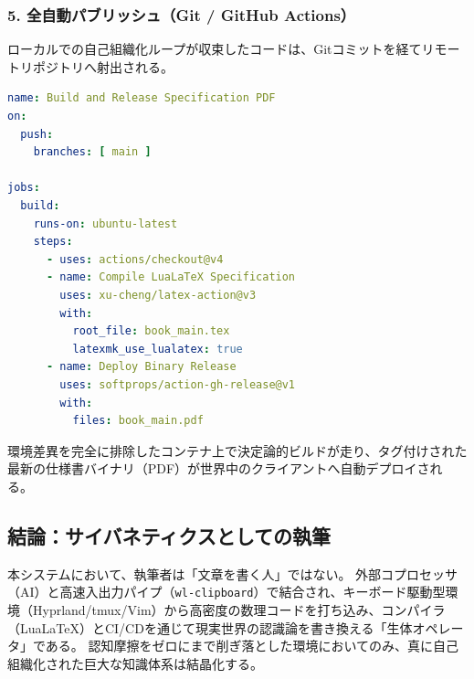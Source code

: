 \subsubsection{5. 全自動パブリッシュ（Git / GitHub Actions）}
ローカルでの自己組織化ループが収束したコードは、Gitコミットを経てリモートリポジトリへ射出される。

\begin{lstlisting}[language=yaml, caption={.github/workflows/build-pdf.yml 概念定義}]
name: Build and Release Specification PDF
on:
  push:
    branches: [ main ]

jobs:
  build:
    runs-on: ubuntu-latest
    steps:
      - uses: actions/checkout@v4
      - name: Compile LuaLaTeX Specification
        uses: xu-cheng/latex-action@v3
        with:
          root_file: book_main.tex
          latexmk_use_lualatex: true
      - name: Deploy Binary Release
        uses: softprops/action-gh-release@v1
        with:
          files: book_main.pdf
\end{lstlisting}

環境差異を完全に排除したコンテナ上で決定論的ビルドが走り、タグ付けされた最新の仕様書バイナリ（PDF）が世界中のクライアントへ自動デプロイされる。

\subsection{結論：サイバネティクスとしての執筆}
本システムにおいて、執筆者は「文章を書く人」ではない。
外部コプロセッサ（AI）と高速入出力パイプ（\texttt{wl-clipboard}）で結合され、キーボード駆動型環境（Hyprland/tmux/Vim）から高密度の数理コードを打ち込み、コンパイラ（LuaLaTeX）とCI/CDを通じて現実世界の認識論を書き換える「生体オペレータ」である。
認知摩擦をゼロにまで削ぎ落とした環境においてのみ、真に自己組織化された巨大な知識体系は結晶化する。
